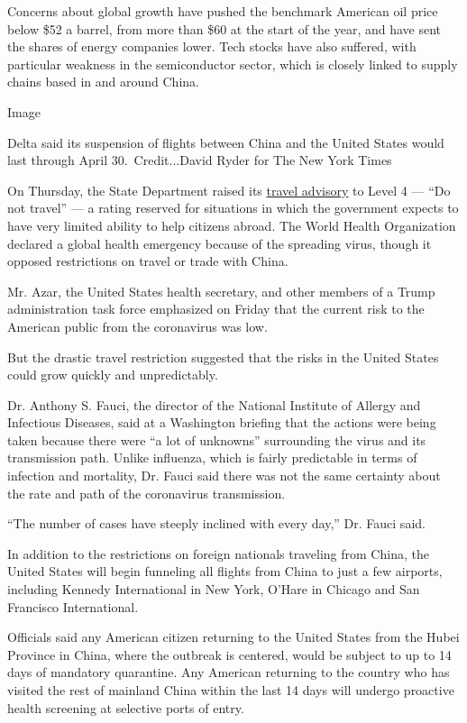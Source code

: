 Concerns about global growth have pushed the benchmark American oil
price below \$52 a barrel, from more than \$60 at the start of the year,
and have sent the shares of energy companies lower. Tech stocks have
also suffered, with particular weakness in the semiconductor sector,
which is closely linked to supply chains based in and around China.

Image

Delta said its suspension of flights between China and the United States
would last through April 30.~Credit...David Ryder for The New York Times

On Thursday, the State Department raised its
\href{https://www.nytimes.com/2020/01/30/world/asia/Coronavirus-travel-advisory-.html}{travel
advisory} to Level 4 --- ``Do not travel'' --- a rating reserved for
situations in which the government expects to have very limited ability
to help citizens abroad. The World Health Organization declared a global
health emergency because of the spreading virus, though it opposed
restrictions on travel or trade with China.

Mr. Azar, the United States health secretary, and other members of a
Trump administration task force emphasized on Friday that the current
risk to the American public from the coronavirus was low.

But the drastic travel restriction suggested that the risks in the
United States could grow quickly and unpredictably.

Dr. Anthony S. Fauci, the director of the National Institute of Allergy
and Infectious Diseases, said at a Washington briefing that the actions
were being taken because there were ``a lot of unknowns'' surrounding
the virus and its transmission path. Unlike influenza, which is fairly
predictable in terms of infection and mortality, Dr. Fauci said there
was not the same certainty about the rate and path of the coronavirus
transmission.

``The number of cases have steeply inclined with every day,'' Dr. Fauci
said.

In addition to the restrictions on foreign nationals traveling from
China, the United States will begin funneling all flights from China to
just a few airports, including Kennedy International in New York, O'Hare
in Chicago and San Francisco International.

Officials said any American citizen returning to the United States from
the Hubei Province in China, where the outbreak is centered, would be
subject to up to 14 days of mandatory quarantine. Any American returning
to the country who has visited the rest of mainland China within the
last 14 days will undergo proactive health screening at selective ports
of entry.

